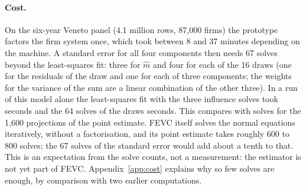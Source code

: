 \paragraph{Cost.} On the six-year Veneto panel (4.1 million rows, 87{,}000 firms) the prototype factors the
firm system once, which took between 8 and 37 minutes depending on the machine. A standard error for all four
components then needs 67 solves beyond the least-squares fit: three for $\hat m$ and four for each of the 16
draws (one for the residuals of the draw and one for each of three components; the weights for the variance of
the sum are a linear combination of the other three). In a run of this model alone the least-squares fit with the three influence solves took
 seconds and the 64 solves of the draws  seconds. This compares with
 solves for the 1{,}600 projections of the point estimate. FEVC itself solves the
normal equations iteratively, without a factorisation, and its point estimate takes roughly 600 to 800 solves;
the 67 solves of the standard error would add about a tenth to that. This is an expectation from the solve
counts, not a measurement: the estimator is not yet part of FEVC. Appendix~\ref{app:cost} explains why so few
solves are enough, by comparison with two earlier computations.
